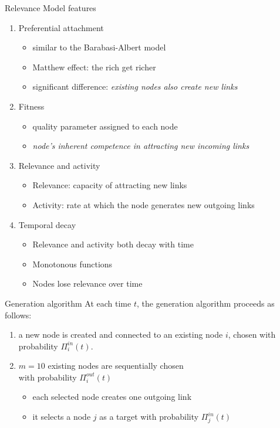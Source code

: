 \documentclass[utf8, compress]{beamer}
\begin{document}
\begin{frame}{Relevance Model features}
    \begin{enumerate}
        \item Preferential attachment
        \begin{itemize}
            \item similar to the Barabasi-Albert model
            \item Matthew effect: the rich get richer
            \item significant difference: \emph{existing nodes also create new links}
        \end{itemize}

        \item Fitness
        \begin{itemize}
            \item quality parameter assigned to each node
            \item \emph{node’s inherent competence in attracting new incoming links}
        \end{itemize}

        \item Relevance and activity
        \begin{itemize}
            \item Relevance: capacity of attracting new links
            \item Activity: rate at which the node generates new outgoing links
        \end{itemize}

        \item Temporal decay
        \begin{itemize}
            \item Relevance and activity both decay with time
            \item Monotonous functions
            \item Nodes lose relevance over time
        \end{itemize}
    \end{enumerate}
\end{frame}

\begin{frame}{Generation algorithm}
    At each time $t$, the generation algorithm proceeds as follows:
    \begin{enumerate}
        \item a new node is created and connected to an existing node $i$, chosen with probability $\Pi_i^{in}(t)$.
        \item $m=10$ existing nodes are sequentially chosen \\ with probability $\Pi_i^{out}(t)$
        \begin{itemize}
            \item each selected node creates one outgoing link
            \item it selects a node $j$ as a target with probability $\Pi_j^{in}(t)$
        \end{itemize}
    \end{enumerate}
\end{frame}
\end{document}
